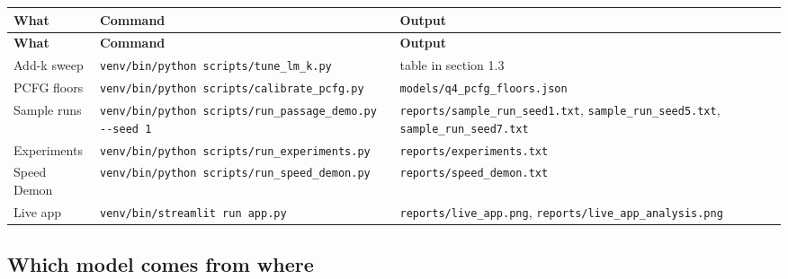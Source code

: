 \documentclass[11pt,a4paper]{article}
\begin{document}
{\footnotesize
\setlength{\tabcolsep}{4pt}
\begin{xltabular}{\linewidth}{l>{\raggedright\arraybackslash}X>{\raggedright\arraybackslash}X}
\toprule
\textbf{What} & \textbf{Command} & \textbf{Output} \\
\midrule
\endfirsthead
\toprule
\textbf{What} & \textbf{Command} & \textbf{Output} \\
\midrule
\endhead
Add-k sweep & \texttt{venv/\allowbreak{}bin/\allowbreak{}python scripts/\allowbreak{}tune\_\allowbreak{}lm\_\allowbreak{}k.\allowbreak{}py} & table in section 1.3 \\
PCFG floors & \texttt{venv/\allowbreak{}bin/\allowbreak{}python scripts/\allowbreak{}calibrate\_\allowbreak{}pcfg.\allowbreak{}py} & \texttt{models/\allowbreak{}q4\_\allowbreak{}pcfg\_\allowbreak{}floors.\allowbreak{}json} \\
Sample runs & \texttt{venv/\allowbreak{}bin/\allowbreak{}python scripts/\allowbreak{}run\_\allowbreak{}passage\_\allowbreak{}demo.\allowbreak{}py -\allowbreak{}-\allowbreak{}seed 1} & \texttt{reports/\allowbreak{}sample\_\allowbreak{}run\_\allowbreak{}seed1.\allowbreak{}txt}, \texttt{sample\_\allowbreak{}run\_\allowbreak{}seed5.\allowbreak{}txt}, \texttt{sample\_\allowbreak{}run\_\allowbreak{}seed7.\allowbreak{}txt} \\
Experiments & \texttt{venv/\allowbreak{}bin/\allowbreak{}python scripts/\allowbreak{}run\_\allowbreak{}experiments.\allowbreak{}py} & \texttt{reports/\allowbreak{}experiments.\allowbreak{}txt} \\
Speed Demon & \texttt{venv/\allowbreak{}bin/\allowbreak{}python scripts/\allowbreak{}run\_\allowbreak{}speed\_\allowbreak{}demon.\allowbreak{}py} & \texttt{reports/\allowbreak{}speed\_\allowbreak{}demon.\allowbreak{}txt} \\
Live app & \texttt{venv/\allowbreak{}bin/\allowbreak{}streamlit run app.\allowbreak{}py} & \texttt{reports/\allowbreak{}live\_\allowbreak{}app.\allowbreak{}png}, \texttt{reports/\allowbreak{}live\_\allowbreak{}app\_\allowbreak{}analysis.\allowbreak{}png} \\
\bottomrule
\end{xltabular}}

\subsection*{Which model comes from where}
\end{document}
